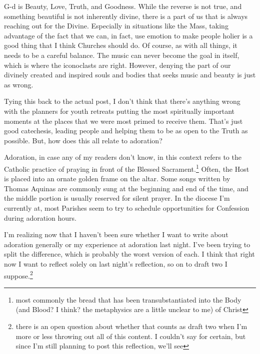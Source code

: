 \documentclass[12pt]{article}[titlepage]
\newcommand{\1}{\={a}}
\newcommand{\2}{\={e}}
\newcommand{\3}{\={\i}}
\newcommand{\4}{\=o}
\newcommand{\5}{\=u}
\newcommand{\6}{\={A}}
\renewcommand{\,}{\textsuperscript{,}}
\begin{document}
G-d is Beauty, Love, Truth, and Goodness.
While the reverse is not true, and something beautiful is not inherently divine, there is a part of us that is always reaching out for the Divine.
Especially in situations like the Mass, taking advantage of the fact that we can, in fact, use emotion to make people holier is a good thing that I think Churches should do.
Of course, as with all things, it needs to be a careful balance.
The music can never become the goal in itself, which is where the iconoclasts are right.
However, denying the part of our divinely created and inspired souls and bodies that seeks music and beauty is just as wrong.
 
Tying this back to the actual post, I don't think that there's anything wrong with the planners for youth retreats putting the most spiritually important moments at the places that we were most primed to receive them.
That's just good catechesis, leading people and helping them to be as open to the Truth as possible.
But, how does this all relate to adoration?
 
Adoration, in case any of my readers don't know, in this context refers to the Catholic practice of praying in front of the Blessed Sacrament.\footnote{most commonly the bread that has been transubstantiated into the Body (and Blood? I think? the metaphysics are a little unclear to me) of Christ}
Often, the Host is placed into an ornate golden frame on the altar.
Some songs written by Thomas Aquinas are commonly sung at the beginning and end of the time, and the middle portion is usually reserved for silent prayer.
In the diocese I'm currently at, most Parishes seem to try to schedule opportunities for Confession during adoration hours.
 
I'm realizing now that I haven't been sure whether I want to write about adoration generally or my experience at adoration last night.
I've been trying to split the difference, which is probably the worst version of each.
I think that right now I want to reflect solely on last night's reflection, so on to draft two I suppose.\footnote{there is an open question about whether that counts as draft two when I'm more or less throwing out all of this content.
I couldn't say for certain, but since I'm still planning to post this reflection, we'll see} 
\end{document}
